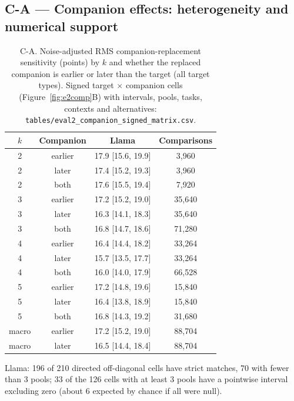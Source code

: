 \subsection*{C-A --- Companion effects: heterogeneity and numerical support}
\begin{table}[h]
\centering\scriptsize
\caption{C-A. Noise-adjusted RMS companion-replacement sensitivity (points) by $k$ and whether the replaced companion is earlier or later than the target (all target types). Signed target $\times$ companion cells (Figure~\ref{fig:e2comp}B) with intervals, pools, tasks, contexts and alternatives: \texttt{tables/eval2\_companion\_signed\_matrix.csv}.}
\label{tab:CA}
\begin{tabular}{cccc}
\toprule
$k$ & Companion & Llama & Comparisons \\
\midrule
2 & earlier & 17.9 [15.6, 19.9] & 3,960 \\
2 & later & 17.4 [15.2, 19.3] & 3,960 \\
2 & both & 17.6 [15.5, 19.4] & 7,920 \\
3 & earlier & 17.2 [15.2, 19.0] & 35,640 \\
3 & later & 16.3 [14.1, 18.3] & 35,640 \\
3 & both & 16.8 [14.7, 18.6] & 71,280 \\
4 & earlier & 16.4 [14.4, 18.2] & 33,264 \\
4 & later & 15.7 [13.5, 17.7] & 33,264 \\
4 & both & 16.0 [14.0, 17.9] & 66,528 \\
5 & earlier & 17.2 [14.8, 19.6] & 15,840 \\
5 & later & 16.4 [13.8, 18.9] & 15,840 \\
5 & both & 16.8 [14.3, 19.2] & 31,680 \\
macro & earlier & 17.2 [15.2, 19.0] & 88,704 \\
macro & later & 16.5 [14.4, 18.4] & 88,704 \\
\bottomrule
\end{tabular}
\end{table}

Llama: 196 of 210 directed off-diagonal cells have strict matches, 70 with fewer than 3 pools; 33 of the 126 cells with at least 3 pools have a pointwise interval excluding zero (about 6 expected by chance if all were null).

